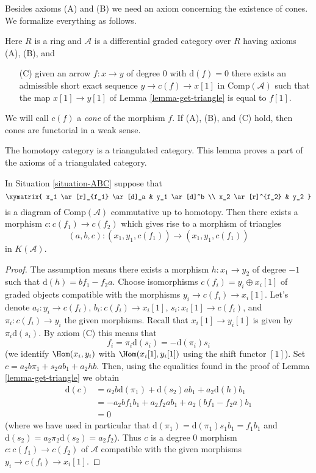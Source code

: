 \noindent
Besides axioms (A) and (B) we need an axiom concerning the existence of
cones. We formalize everything as follows.

\begin{situation}
\label{situation-ABC}
Here $R$ is a ring and $\mathcal{A}$ is a differential graded category
over $R$ having axioms (A), (B), and
\begin{enumerate}
\item[(C)] given an arrow $f : x \to y$ of degree $0$ with
$\text{d}(f) = 0$ there exists an admissible short exact sequence
$y \to c(f) \to x[1]$ in $\text{Comp}(\mathcal{A})$ such that the map
$x[1] \to y[1]$ of Lemma \ref{lemma-get-triangle} is equal to $f[1]$.
\end{enumerate}
\end{situation}

\noindent
We will call $c(f)$ a {\it cone} of the morphism $f$.
If (A), (B), and (C) hold, then
cones are functorial in a weak sense.

\begin{lemma}
\label{lemma-cone}
\begin{slogan}
The homotopy category is a triangulated category.
This lemma proves a part of the axioms of a triangulated category.
\end{slogan}
In Situation \ref{situation-ABC} suppose that
$$
\xymatrix{
x_1 \ar[r]_{f_1} \ar[d]_a & y_1 \ar[d]^b \\
x_2 \ar[r]^{f_2} & y_2
}
$$
is a diagram of $\text{Comp}(\mathcal{A})$ commutative up to homotopy.
Then there exists a morphism $c : c(f_1) \to c(f_2)$ which gives rise to
a morphism of triangles
$$
(a, b, c) : (x_1, y_1, c(f_1)) \to (x_1, y_1, c(f_1))
$$
in $K(\mathcal{A})$.
\end{lemma}

\begin{proof}
The assumption means there exists a morphism $h : x_1 \to y_2$ of degree
$-1$ such that $\text{d}(h) = b f_1 - f_2 a$. Choose isomorphisms
$c(f_i) = y_i \oplus x_i[1]$ of graded objects compatible with the
morphisms $y_i \to c(f_i) \to x_i[1]$. Let's denote
$a_i : y_i \to c(f_i)$, $b_i : c(f_i) \to x_i[1]$, $s_i : x_i[1] \to c(f_i)$,
and $\pi_i : c(f_i) \to y_i$ the given morphisms. Recall that
$x_i[1] \to y_i[1]$ is given by $\pi_i \text{d}(s_i)$. By axiom (C)
this means that
$$
f_i = \pi_i \text{d}(s_i) = - \text{d}(\pi_i) s_i
$$
(we identify $\Hom(x_i, y_i)$ with $\Hom(x_i[1], y_i[1])$
using the shift functor $[1]$).
Set $c = a_2 b \pi_1 + s_2 a b_1 + a_2hb$. Then, using the
equalities found in the proof of Lemma \ref{lemma-get-triangle}
we obtain
\begin{align*}
\text{d}(c)
& =
a_2 b \text{d}(\pi_1) + \text{d}(s_2) a b_1 + a_2 \text{d}(h) b_1 \\
& =
- a_2 b f_1 b_1 + a_2 f_2 a b_1 + a_2 (b f_1 - f_2 a) b_1 \\
& = 0
\end{align*}
(where we have used in particular that
$\text{d}(\pi_1) = \text{d}(\pi_1) s_1 b_1 = f_1 b_1$ and
$\text{d}(s_2) = a_2 \pi_2 \text{d}(s_2) = a_2 f_2$).
Thus $c$ is a degree $0$ morphism $c : c(f_1) \to c(f_2)$ of $\mathcal{A}$
compatible with the given morphisms $y_i \to c(f_i) \to x_i[1]$.
\end{proof}

